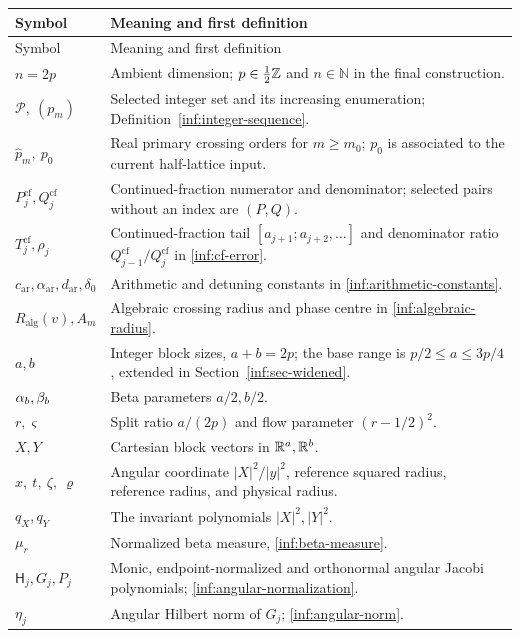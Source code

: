 \begingroup\small
\renewcommand{\arraystretch}{1.16}
\begin{longtable}{@{}>{\raggedright\arraybackslash}p{}>{\raggedright\arraybackslash}p{}@{}}
\toprule Symbol & Meaning and first definition\\\midrule
\endfirsthead
\toprule Symbol & Meaning and first definition\\\midrule
\endhead
$n=2p$ & Ambient dimension; $p\in\tfrac12\mathbb{Z}$ and $n\in\mathbb N$ in the final construction.\\
$\mathcal P,\ (p_m)$ & Selected integer set and its increasing enumeration; Definition~\ref{inf:integer-sequence}.\\
$\widehat p_m,\ p_0$ & Real primary crossing orders for $m\ge m_0$; $p_0$ is associated to the current half-lattice input.\\
$P_j^{\mathrm{cf}},Q_j^{\mathrm{cf}}$ & Continued-fraction numerator and denominator; selected pairs without an index are $(P,Q)$.\\
$T_j^{\mathrm{cf}},\rho_j$ & Continued-fraction tail $[a_{j+1};a_{j+2},\ldots]$ and denominator ratio $Q_{j-1}^{\mathrm{cf}}/Q_j^{\mathrm{cf}}$ in \eqref{inf:cf-error}.\\
$c_{\mathrm{ar}},\alpha_{\mathrm{ar}},d_{\mathrm{ar}},\delta_0$ & Arithmetic and detuning constants in \eqref{inf:arithmetic-constants}.\\
$R_{\mathrm{alg}}(v),A_m$ & Algebraic crossing radius and phase centre in \eqref{inf:algebraic-radius}.\\
$a,b$ & Integer block sizes, $a+b=2p$; the base range is $p/2\le a\le3p/4$, extended in Section~\ref{inf:sec-widened}.\\
$\alpha_b,\beta_b$ & Beta parameters $a/2,b/2$.\\
$r,\varsigma$ & Split ratio $a/(2p)$ and flow parameter $(r-1/2)^2$.\\
$X,Y$ & Cartesian block vectors in $\mathbb{R}^a,\mathbb{R}^b$.\\
$x,\ t,\ \zeta,\ \varrho$ & Angular coordinate $|X|^2/|y|^2$, reference squared radius, reference radius, and physical radius.\\
$q_X,q_Y$ & The invariant polynomials $|X|^2,|Y|^2$.\\
$\mu_r$ & Normalized beta measure, \eqref{inf:beta-measure}.\\
$\mathsf H_j,G_j,P_j$ & Monic, endpoint-normalized and orthonormal angular Jacobi polynomials; \eqref{inf:angular-normalization}.\\
$\eta_j$ & Angular Hilbert norm of $G_j$; \eqref{inf:angular-norm}.\\

\end{longtable}
